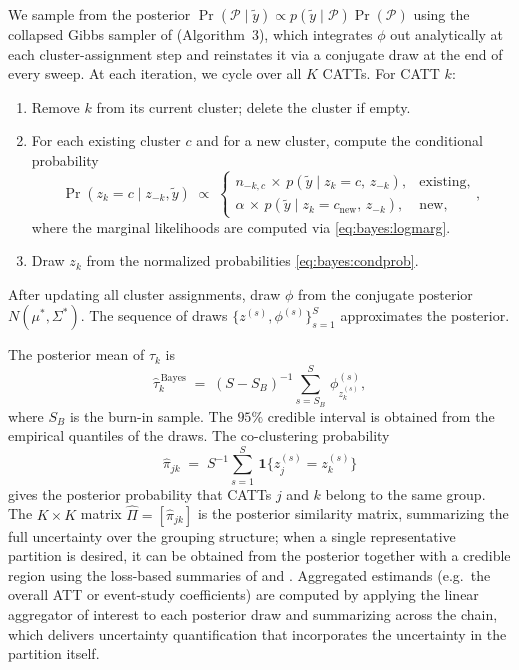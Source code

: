 \documentclass[margin=5in, 12pt]{article}
\newcommand{\1}{\mathbbm{1}}
\begin{document}
  We sample from the posterior $\Pr(\mathcal{P} \mid \tilde{y}) \propto p(\tilde{y} \mid \mathcal{P})\Pr(\mathcal{P})$ using the
  collapsed Gibbs sampler of \citet{neal2000} (Algorithm~3), which integrates $\phi$ out analytically at each cluster-assignment
  step and reinstates it via a conjugate draw at the end of every sweep. At each iteration, we cycle over all $K$ CATTs. For CATT
   $k$:
  \begin{enumerate}
  \item Remove $k$ from its current cluster; delete the cluster if empty.
  \item For each existing cluster $c$ and for a new cluster, compute the conditional probability
  \begin{equation}
    \Pr(z_{k} = c \mid z_{-k},\tilde{y}) \;\propto\;
    \begin{cases}
      n_{-k,c}\,\times\, p(\tilde{y} \mid z_{k} = c,\, z_{-k}), & \text{existing,}\\[4pt]
      \alpha\,\times\, p(\tilde{y} \mid z_{k} = c_{\text{new}},\, z_{-k}), & \text{new,}
    \end{cases},
    \label{eq:bayes:condprob}
  \end{equation}
  where the marginal likelihoods are computed via \eqref{eq:bayes:logmarg}.
  \item Draw $z_{k}$ from the normalized probabilities \eqref{eq:bayes:condprob}.
  \end{enumerate}
  After updating all cluster assignments, draw $\phi$ from the conjugate posterior
  $N(\mu^{\ast},\Sigma^{\ast})$. The sequence of draws $\{z^{(s)},\phi^{(s)}\}_{s=1}^{S}$
  approximates the posterior.


The posterior mean of $\tau_{k}$ is
  \begin{equation}
    \hat{\tau}_{k}^{\,\text{Bayes}} \;=\; (S-S_B)^{-1}\sum_{s = S_B}^{S}\,\phi^{(s)}_{z_{k}^{(s)}},
    \label{eq:bayes:tauhat}
  \end{equation}
  where $S_B$ is the burn-in sample. The $95\%$ credible interval is obtained from the empirical quantiles of the draws. The co-clustering probability
  \begin{equation}
    \hat{\pi}_{jk} \;=\; S^{-1}\sum_{s = 1}^{S}\, \mathbf{1}\!\bigl\{z_{j}^{(s)} = z_{k}^{(s)}\bigr\}
    \label{eq:bayes:cocluster}
  \end{equation}
  gives the posterior probability that CATTs $j$ and $k$ belong to the same group. The $K \times K$ matrix $\hat{\Pi} = [\hat{\pi}_{jk}]$ is the posterior similarity matrix, summarizing the full uncertainty over the grouping structure; when a single representative partition is desired, it can be obtained from the posterior together with a credible region using the loss-based summaries of \citet{lau2007} and \citet{wade2018}. Aggregated estimands (e.g.\ the overall ATT or event-study coefficients) are computed by applying the linear aggregator of interest to each posterior draw and summarizing across the chain, which delivers uncertainty quantification that incorporates the uncertainty in the partition itself.
\end{document}

